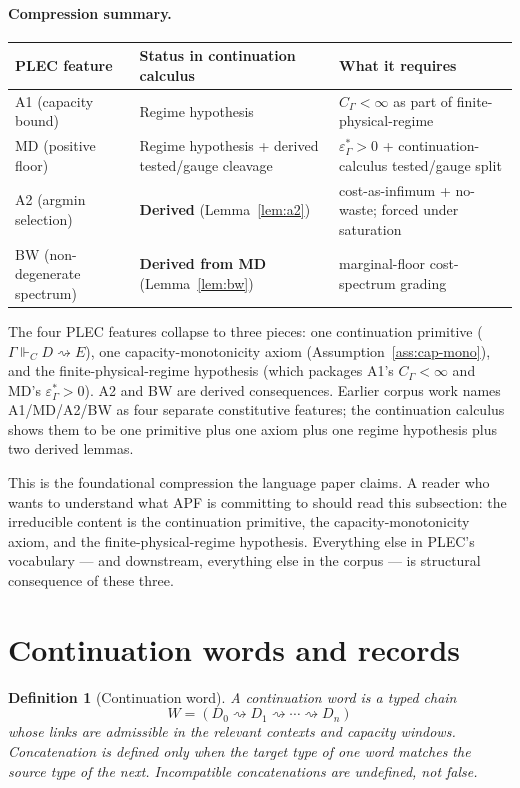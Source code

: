 \documentclass[11pt]{article}
\newtheorem{definition}[theorem]{Definition}
\theoremstyle{remark}
\newcommand{\G}{\Gamma}
\newcommand{\entails}{\Vdash}
\newcommand{\goes}{\rightsquigarrow}
\newcommand{\floor}{\varepsilon^{\!*}_{\G}}
\begin{document}
\paragraph{Compression summary.}

\begin{center}
\begin{tabularx}{\textwidth}{p{}p{}X}
\toprule
\textbf{PLEC feature} & \textbf{Status in continuation calculus} & \textbf{What it requires}\\
\midrule
A1 (capacity bound) & Regime hypothesis & $C_\G < \infty$ as part of finite-physical-regime\\
MD (positive floor) & Regime hypothesis + derived tested/gauge cleavage & $\floor > 0$ + continuation-calculus tested/gauge split\\
A2 (argmin selection) & \textbf{Derived} (Lemma~\ref{lem:a2}) & cost-as-infimum + no-waste; forced under saturation\\
BW (non-degenerate spectrum) & \textbf{Derived from MD} (Lemma~\ref{lem:bw}) & marginal-floor cost-spectrum grading\\
\bottomrule
\end{tabularx}
\end{center}

The four PLEC features collapse to three pieces: one continuation primitive ($\G\entails_C D\goes E$), one capacity-monotonicity axiom (Assumption~\ref{ass:cap-mono}), and the finite-physical-regime hypothesis (which packages A1's $C_\G < \infty$ and MD's $\floor > 0$).  A2 and BW are derived consequences.  Earlier corpus work names A1/MD/A2/BW as four separate constitutive features; the continuation calculus shows them to be one primitive plus one axiom plus one regime hypothesis plus two derived lemmas.

This is the foundational compression the language paper claims.  A reader who wants to understand what APF is committing to should read this subsection: the irreducible content is the continuation primitive, the capacity-monotonicity axiom, and the finite-physical-regime hypothesis.  Everything else in PLEC's vocabulary --- and downstream, everything else in the corpus --- is structural consequence of these three.

\section{Continuation words and records}

\begin{definition}[Continuation word]
A continuation word is a typed chain
\[
        W=(D_0\goes D_1\goes\cdots\goes D_n)
\]
whose links are admissible in the relevant contexts and capacity windows.  Concatenation is defined only when the target type of one word matches the source type of the next.  Incompatible concatenations are undefined, not false.
\end{definition}
\end{document}
